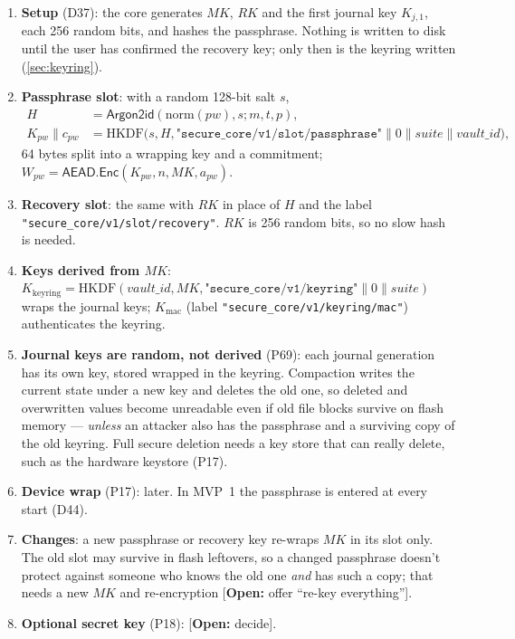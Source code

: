 \documentclass[11pt,a4paper]{article}
\newcommand{\concat}{\mathbin{\|}}
\newcommand{\AEAD}{\mathsf{AEAD}}
\newcommand{\Enc}{\mathsf{Enc}}
\newcommand{\Argon}{\mathsf{Argon2id}}
\newcommand{\str}[1]{\texttt{"#1"}}
\newcommand{\todo}[1]{\textcolor{red!70!black}{[\textbf{Open:} #1]}}
\newcommand{\dref}[1]{\textsf{#1}} %
\begin{document}
\begin{enumerate}
  \item \textbf{Setup} (\dref{D37}): the core generates $MK$, $RK$ and the first journal key $K_{j,1}$, each 256 random bits, and hashes the passphrase. Nothing is written to disk until the user has confirmed the recovery key; only then is the keyring written (\cref{sec:keyring}).
  \item \textbf{Passphrase slot}: with a random 128-bit salt $s$,
  \begin{align*}
    H &= \Argon(\mathrm{norm}(pw), s; m, t, p),\\
    K_{pw} \concat c_{pw} &= \mathrm{HKDF}\big(s, H, \str{secure\_core/v1/slot/passphrase} \concat 0 \concat \mathit{suite} \concat \mathit{vault\_id}\big),
  \end{align*}
  64 bytes split into a wrapping key and a commitment; $W_{pw} = \AEAD.\Enc(K_{pw}, n, MK, a_{pw})$.
  \item \textbf{Recovery slot}: the same with $RK$ in place of $H$ and the label \str{secure\_core/v1/slot/recovery}. $RK$ is 256 random bits, so no slow hash is needed.
  \item \textbf{Keys derived from $MK$}: $K_{\mathrm{keyring}} = \mathrm{HKDF}(\mathit{vault\_id}, MK, \str{secure\_core/v1/keyring} \concat 0 \concat \mathit{suite})$ wraps the journal keys; $K_{\mathrm{mac}}$ (label \str{secure\_core/v1/keyring/mac}) authenticates the keyring.
  \item \textbf{Journal keys are random, not derived} (\dref{P69}): each journal generation has its own key, stored wrapped in the keyring. Compaction writes the current state under a new key and deletes the old one, so deleted and overwritten values become unreadable even if old file blocks survive on flash memory --- \emph{unless} an attacker also has the passphrase and a surviving copy of the old keyring. Full secure deletion needs a key store that can really delete, such as the hardware keystore (\dref{P17}).
  \item \textbf{Device wrap} (\dref{P17}): later. In MVP~1 the passphrase is entered at every start (\dref{D44}).
  \item \textbf{Changes}: a new passphrase or recovery key re-wraps $MK$ in its slot only. The old slot may survive in flash leftovers, so a changed passphrase doesn't protect against someone who knows the old one \emph{and} has such a copy; that needs a new $MK$ and re-encryption \todo{offer ``re-key everything''}.
  \item \textbf{Optional secret key} (\dref{P18}): \todo{decide}.
\end{enumerate}
\end{document}
